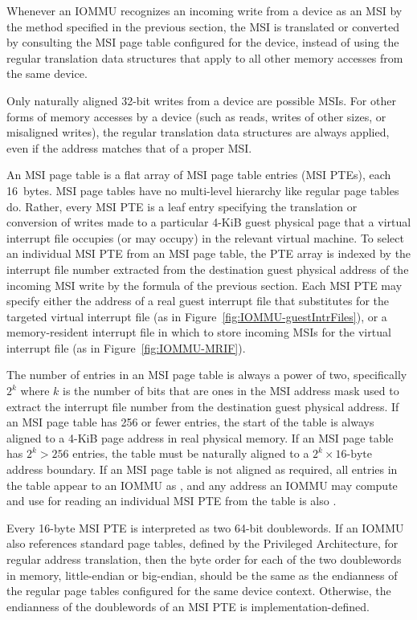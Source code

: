 Whenever an \mbox{IOMMU} recognizes an incoming write from a device as
an MSI by the method specified in the previous section, the MSI is
translated or converted by consulting the MSI page table configured for
the device, instead of using the regular translation data structures
that apply to all other memory accesses from the same device.

Only naturally aligned \mbox{32-bit} writes from a device are possible
MSIs.
For other forms of memory accesses by a device (such as reads, writes
of other sizes, or misaligned writes), the regular translation data
structures are always applied, even if the address matches that of a
proper MSI.

An MSI page table is a flat array of MSI page table entries (MSI PTEs),
each 16~bytes.
MSI page tables have no multi-level hierarchy like regular {\RISCV}
page tables do.
Rather, every MSI PTE is a leaf entry specifying the translation or
conversion of writes made to a particular \mbox{4-KiB} guest physical
page that a virtual interrupt file occupies (or may occupy) in the
relevant virtual machine.
To select an individual MSI PTE from an MSI page table, the PTE array
is indexed by the interrupt file number extracted from the destination
guest physical address of the incoming MSI write by the formula of the
previous section.
Each MSI PTE may specify either the address of a real guest interrupt
file that substitutes for the targeted virtual interrupt file (as in
Figure~\ref{fig:IOMMU-guestIntrFiles}), or a memory-resident interrupt
file in which to store incoming MSIs for the virtual interrupt file
(as in Figure~\ref{fig:IOMMU-MRIF}).

The number of entries in an MSI page table is always a power of two,
specifically $\mbox{2}^{k}$ where $k$ is the number of bits that are
ones in the MSI address mask used to extract the interrupt file number
from the destination guest physical address.
If an MSI page table has 256 or fewer entries, the start of the table
is always aligned to a \mbox{4-KiB} page address in real physical
memory.
If an MSI page table has ${\mbox{2}^{k} > \mbox{256}}$
entries, the table must be naturally aligned to a
$\mbox{2}^{k}\times \mbox{16-byte}$ address boundary.
If an MSI page table is not aligned as required, all entries in the
table appear to an \mbox{IOMMU} as {\unspecified}, and any address an
\mbox{IOMMU} may compute and use for reading an individual MSI PTE from the
table is also {\unspecified}.

Every \mbox{16-byte} MSI PTE is interpreted as two \mbox{64-bit}
doublewords.
If an \mbox{IOMMU} also references standard {\RISCV} page tables, defined by
the {\RISCV} Privileged Architecture, for regular address translation,
then the byte order for each of the two doublewords in memory,
little-endian or big-endian, should be the same as the endianness
of the regular {\RISCV} page tables configured for the same device
context.
Otherwise, the endianness of the doublewords of an MSI PTE is
implementation-defined.

